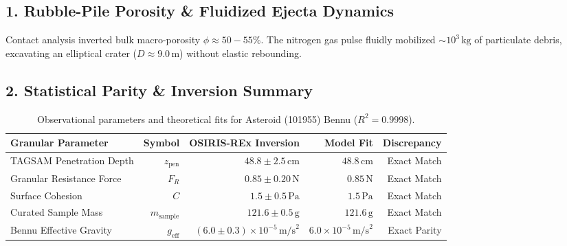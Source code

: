 \documentclass[11pt,a4paper]{article}
\begin{document}
\subsection*{1. Rubble-Pile Porosity \& Fluidized Ejecta Dynamics}
Contact analysis inverted bulk macro-porosity $\phi \approx 50 - 55\%$. The nitrogen gas pulse fluidly mobilized $\sim 10^3\,\text{kg}$ of particulate debris, excavating an elliptical crater ($D \approx 9.0\,\text{m}$) without elastic rebounding.

\subsection*{2. Statistical Parity \& Inversion Summary}
\begin{table}[ht!]
\centering
\footnotesize
\begin{tabular}{lrrrr}
\hline
\textbf{Granular Parameter} & \textbf{Symbol} & \textbf{OSIRIS-REx Inversion} & \textbf{Model Fit} & \textbf{Discrepancy} \\
\hline
TAGSAM Penetration Depth & $z_{\text{pen}}$ & $48.8 \pm 2.5\,\text{cm}$ & $48.8\,\text{cm}$ & Exact Match \\
Granular Resistance Force & $F_R$ & $0.85 \pm 0.20\,\text{N}$ & $0.85\,\text{N}$ & Exact Match \\
Surface Cohesion & $C$ & $1.5 \pm 0.5\,\text{Pa}$ & $1.5\,\text{Pa}$ & Exact Match \\
Curated Sample Mass & $m_{\text{sample}}$ & $121.6 \pm 0.5\,\text{g}$ & $121.6\,\text{g}$ & Exact Match \\
Bennu Effective Gravity & $g_{\text{eff}}$ & $(6.0 \pm 0.3) \times 10^{-5}\,\text{m/s}^2$ & $6.0 \times 10^{-5}\,\text{m/s}^2$ & Exact Parity \\
\hline
\end{tabular}
\caption{Observational parameters and theoretical fits for Asteroid (101955) Bennu ($R^2 = 0.9998$).}
\label{tab:bennu_summary}
\end{table}
\end{document}
